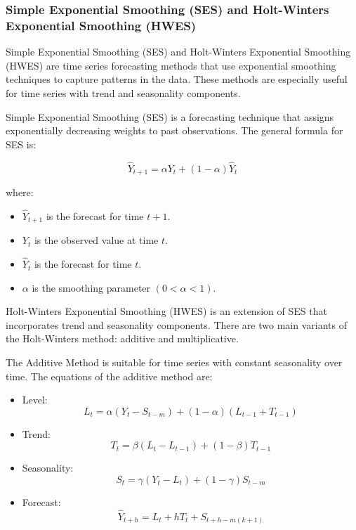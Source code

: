 \subsubsection{Simple Exponential Smoothing (SES) and Holt-Winters Exponential Smoothing (HWES)}

Simple Exponential Smoothing (SES) and Holt-Winters Exponential Smoothing (HWES) are time series forecasting methods that use exponential smoothing techniques to capture patterns in the data. These methods are especially useful for time series with trend and seasonality components.
\vspace{10pt}

Simple Exponential Smoothing (SES) is a forecasting technique that assigns exponentially decreasing weights to past observations. The general formula for SES is:

\begin{equation}
\hat{Y}_{t+1} = \alpha Y_t + (1-\alpha) \hat{Y}_t
\end{equation}

where:
\begin{itemize}
    \item \( \hat{Y}_{t+1} \) is the forecast for time \( t+1 \).
    \item \( Y_t \) is the observed value at time \( t \).
    \item \( \hat{Y}_t \) is the forecast for time \( t \).
    \item \( \alpha \) is the smoothing parameter \( (0 < \alpha < 1) \).
\end{itemize}

Holt-Winters Exponential Smoothing (HWES) is an extension of SES that incorporates trend and seasonality components. There are two main variants of the Holt-Winters method: additive and multiplicative.

The Additive Method is suitable for time series with constant seasonality over time. The equations of the additive method are:

\begin{itemize}
    \item Level:
    \begin{equation}
    L_t = \alpha (Y_t - S_{t-m}) + (1-\alpha)(L_{t-1} + T_{t-1})
    \end{equation}
    \item Trend:
    \begin{equation}
    T_t = \beta (L_t - L_{t-1}) + (1-\beta) T_{t-1}
    \end{equation}
    \item Seasonality:
    \begin{equation}
    S_t = \gamma (Y_t - L_t) + (1-\gamma) S_{t-m}
    \end{equation}
    \item Forecast:
    \begin{equation}
    \hat{Y}_{t+h} = L_t + h T_t + S_{t+h-m(k+1)}
    \end{equation}
\end{itemize}

